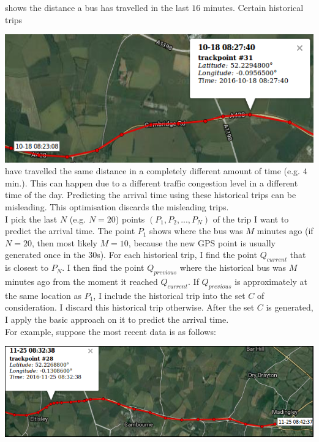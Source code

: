 \documentclass[12pt,a4paper,oneside,openright]{report}
\begin{document}
shows the distance a bus has travelled in the last $16$ minutes. Certain historical
trips

\includegraphics[scale = 0.7]{figs/inaccurate_historical.png} \\

have travelled the same distance in a completely different amount of 
time (e.g. $4$ min.). This can happen due to a different traffic congestion level
in a different time of the day. Predicting the arrival time using
these historical trips can be misleading. This optimisation discards the misleading
trips. \\

I pick the last $N$ (e.g. $N = 20$) points $(P_1, P_2, ..., P_N)$ of the trip I want to predict
the arrival time. The point $P_1$ shows where the bus was $M$ minutes
ago (if $N=20$, then most likely $M=10$, because the new GPS point is usually generated once in the 
30s). For each historical trip, I find the point $Q_{current}$ that is closest to $P_{N}$.
I then find the point $Q_{previous}$ where the historical bus was $M$ minutes
ago from the moment it reached $Q_{current}$. If $Q_{previous}$ is approximately at the same location
as $P_{1}$, I include the historical trip into the set $C$ of consideration.
I discard this historical trip otherwise. After the set $C$ is generated, I apply the basic
approach on it to predict the arrival time. \\

For example, suppose the most recent data is as follows:

\includegraphics[width=\textwidth]{figs/optimisation_match1.png}
\end{document}
